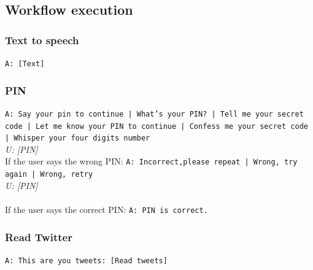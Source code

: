 \subsection{Workflow execution}

\subsubsection{Text to speech}
\texttt{A: [Text]}

\subsubsection{PIN}
\texttt{A: Say your pin to continue | What's your PIN? | Tell me your secret code | Let me know your PIN to continue | Confess me your secret code | Whisper your four digits number}\\
\textit{U: [PIN] }\\
If the user says the wrong PIN:
\texttt{A: Incorrect,please repeat | Wrong, try again | Wrong, retry }\\
\textit{U: [PIN]}\\\\
If the user says the correct PIN:
\texttt{A: PIN is correct.}\\


\subsubsection{Read Twitter}
\texttt{A: This are you tweets: [Read tweets]}\\


